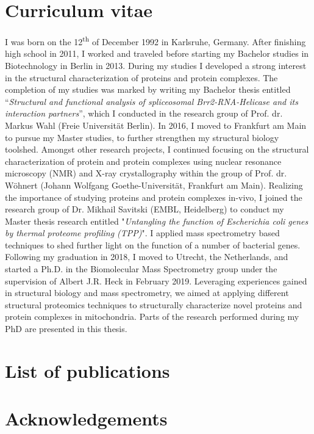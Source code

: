 \renewcommand{\bibpreamble}{}
\renewcommand{\bibpostamble}{}
\renewcommand\bibfont{\normalfont\fontsize{8.58}{8}\selectfont}

 \label{ch-7}
\clearpage
\section{Curriculum vitae}
I was born on the 12\textsuperscript{th} of December 1992 in Karlsruhe, Germany. After finishing high school in 2011, I worked and traveled before starting my Bachelor studies in Biotechnology in Berlin in 2013. During my studies I developed a strong interest in the structural characterization of proteins and protein complexes. The completion of my studies was marked by writing my Bachelor thesis entitled “\emph{Structural and functional analysis of spliceosomal Brr2-RNA-Helicase and its interaction partners}”, which I conducted in the research group of Prof. dr. Markus Wahl (Freie Universität Berlin). In 2016, I moved to Frankfurt am Main to pursue my Master studies, to further strengthen my structural biology toolshed. Amongst other research projects, I continued focusing on the structural characterization of protein and protein complexes using nuclear resonance microscopy (NMR) and X-ray crystallography within the group of Prof. dr. Wöhnert (Johann Wolfgang Goethe-Universität, Frankfurt am Main). Realizing the importance of studying proteins and protein complexes in-vivo, I joined the research group of Dr. Mikhail Savitski (EMBL, Heidelberg) to conduct my Master thesis research entitled "\emph{Untangling the function of Escherichia coli genes by thermal proteome profiling (TPP)}". I applied mass spectrometry based techniques to shed further light on the function of a number of bacterial genes. Following my graduation in 2018, I moved to Utrecht, the Netherlands, and started a Ph.D. in the Biomolecular Mass Spectrometry group under the supervision of Albert J.R. Heck in February 2019. Leveraging experiences gained in structural biology and mass spectrometry, we aimed at applying different structural proteomics techniques to structurally characterize novel proteins and protein complexes in mitochondria. Parts of the research performed during my PhD are presented in this thesis.
\clearpage
\section{List of publications}
\nocite{*}


\clearpage
\section{Acknowledgements}
